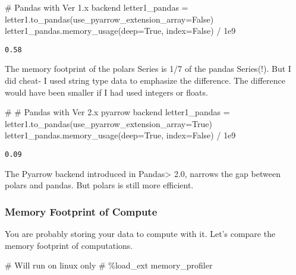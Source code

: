 \documentclass[
  letterpaper,
  DIV=11,
  numbers=noendperiod]{scrartcl}
\newenvironment{Shaded}{\begin{snugshade}}{\end{snugshade}}
\newcommand{\CommentTok}[1]{\textcolor[rgb]{0.37,0.37,0.37}{#1}}
\newcommand{\FloatTok}[1]{\textcolor[rgb]{0.68,0.00,0.00}{#1}}
\newcommand{\NormalTok}[1]{\textcolor[rgb]{0.00,0.23,0.31}{#1}}
\newcommand{\OperatorTok}[1]{\textcolor[rgb]{0.37,0.37,0.37}{#1}}
\newcommand{\VariableTok}[1]{\textcolor[rgb]{0.07,0.07,0.07}{#1}}
\begin{document}
\begin{Shaded}
\begin{Highlighting}[]
\CommentTok{\# Pandas with Ver 1.x backend}
\NormalTok{letter1\_pandas }\OperatorTok{=}\NormalTok{ letter1.to\_pandas(use\_pyarrow\_extension\_array}\OperatorTok{=}\VariableTok{False}\NormalTok{) }
\NormalTok{letter1\_pandas.memory\_usage(deep}\OperatorTok{=}\VariableTok{True}\NormalTok{, index}\OperatorTok{=}\VariableTok{False}\NormalTok{) }\OperatorTok{/} \FloatTok{1e9}
\end{Highlighting}
\end{Shaded}

\begin{verbatim}
0.58
\end{verbatim}

The memory footprint of the polars Series is 1/7 of the pandas
Series(!). But I did cheat- I used string type data to emphasize the
difference. The difference would have been smaller if I had used
integers or floats.

\begin{Shaded}
\begin{Highlighting}[]
\CommentTok{\# \# Pandas with Ver 2.x pyarrow backend}
\NormalTok{letter1\_pandas }\OperatorTok{=}\NormalTok{ letter1.to\_pandas(use\_pyarrow\_extension\_array}\OperatorTok{=}\VariableTok{True}\NormalTok{) }
\NormalTok{letter1\_pandas.memory\_usage(deep}\OperatorTok{=}\VariableTok{True}\NormalTok{, index}\OperatorTok{=}\VariableTok{False}\NormalTok{) }\OperatorTok{/} \FloatTok{1e9}
\end{Highlighting}
\end{Shaded}

\begin{verbatim}
0.09
\end{verbatim}

The Pyarrow backend introduced in Pandas\textgreater{} 2.0, narrows the
gap between polars and pandas. But polars is still more efficient.

\hypertarget{memory-footprint-of-compute}{%
\subsubsection{Memory Footprint of
Compute}\label{memory-footprint-of-compute}}

You are probably storing your data to compute with it. Let's compare the
memory footprint of computations.

\begin{Shaded}
\begin{Highlighting}[]
\CommentTok{\# Will run on linux only}
\CommentTok{\# \%load\_ext memory\_profiler}
\end{Highlighting}
\end{Shaded}
\end{document}
